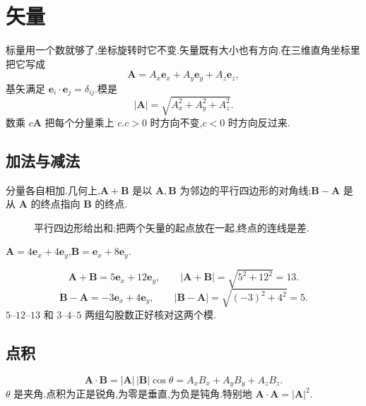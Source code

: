 \section{矢量}

标量用一个数就够了,坐标旋转时它不变.矢量既有大小也有方向.在三维直角坐标里把它写成
\begin{equation}
  \mathbf{A}=A_x\mathbf{e}_x+A_y\mathbf{e}_y+A_z\mathbf{e}_z,
\end{equation}
基矢满足 $\mathbf{e}_i\cdot\mathbf{e}_j=\delta_{ij}$.模是
\begin{equation}
  |\mathbf{A}|=\sqrt{A_x^2+A_y^2+A_z^2}.
\end{equation}
数乘 $c\mathbf{A}$ 把每个分量乘上 $c$.$c>0$ 时方向不变,$c<0$ 时方向反过来.

\subsection{加法与减法}
分量各自相加.几何上,$\mathbf{A}+\mathbf{B}$ 是以 $\mathbf{A},\mathbf{B}$ 为邻边的平行四边形的对角线;$\mathbf{B}-\mathbf{A}$ 是从 $\mathbf{A}$ 的终点指向 $\mathbf{B}$ 的终点.

\begin{figure}[htb]
  \centering
  
  \caption{平行四边形给出和;把两个矢量的起点放在一起,终点的连线是差.}
  \label{fig:sum-diff}
\end{figure}

\begin{example}
$\mathbf{A}=4\mathbf{e}_x+4\mathbf{e}_y$,$\mathbf{B}=\mathbf{e}_x+8\mathbf{e}_y$.
\end{example}
\begin{solution}
\begin{equation}
  \mathbf{A}+\mathbf{B}=5\mathbf{e}_x+12\mathbf{e}_y,
  \qquad
  |\mathbf{A}+\mathbf{B}|=\sqrt{5^2+12^2}=13.
\end{equation}
\begin{equation}
  \mathbf{B}-\mathbf{A}=-3\mathbf{e}_x+4\mathbf{e}_y,
  \qquad
  |\mathbf{B}-\mathbf{A}|=\sqrt{(-3)^2+4^2}=5.
\end{equation}
$5$--$12$--$13$ 和 $3$--$4$--$5$ 两组勾股数正好核对这两个模.
\end{solution}

\subsection{点积}
\begin{equation}
  \mathbf{A}\cdot\mathbf{B}=|\mathbf{A}|\,|\mathbf{B}|\cos\theta
  =A_x B_x+A_y B_y+A_z B_z.
\end{equation}
$\theta$ 是夹角.点积为正是锐角,为零是垂直,为负是钝角.特别地 $\mathbf{A}\cdot\mathbf{A}=|\mathbf{A}|^2$.

